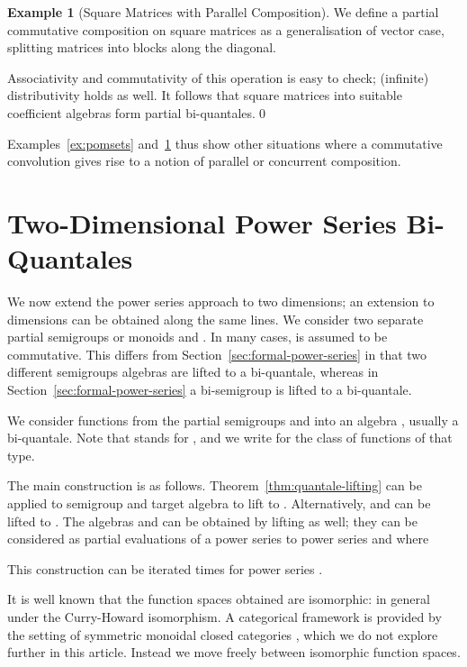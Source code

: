 \documentclass[12pt]{article}
\theoremstyle{definition}
\newtheorem{example}{Example}
\newcommand{\refsec}[1]{Section~\ref{#1}}
\begin{document}
 \begin{example}[Square Matrices with Parallel Composition]\label{ex:matrix-par}
   We define a partial commutative composition  on square
   matrices as a generalisation of vector case, splitting matrices
   into blocks along the diagonal.
   
   Associativity and commutativity of this operation is easy to check;
   (infinite) distributivity holds as well. It follows that square
   matrices into suitable coefficient algebras form partial
   bi-quantales.\qed
 \end{example}
 Examples~\ref{ex:pomsets} and~\ref{ex:matrix-par} thus show other
 situations where a commutative convolution gives rise to a notion of
 parallel or concurrent composition.




\section{Two-Dimensional Power Series
  Bi-Quantales}\label{sec:fpsbiquantale}

We now extend the power series approach to two dimensions; an
extension to  dimensions can be obtained along the same lines.  We
consider two separate partial semigroups or monoids  and
. In many cases,  is assumed to be
commutative. This differs from \refsec{sec:formal-power-series} in
that two different semigroups algebras are lifted to a bi-quantale,
whereas in \refsec{sec:formal-power-series} a bi-semigroup is lifted
to a bi-quantale.

We consider functions  from the partial semigroups
 and  into an algebra , usually a bi-quantale. Note that
 stands for , and we write  for
the class of functions of that type.

The main construction is as
follows. Theorem~\ref{thm:quantale-lifting} can be applied to
semigroup  and target algebra  to lift to
. Alternatively,  and  can be lifted to
. The algebras  and  can be
obtained by lifting as well; they can be considered as partial
evaluations of a power series  to power series
 and  where 

This construction can be iterated  times for power series
.

It is well known that the function spaces obtained are isomorphic: in
general 
under the Curry-Howard isomorphism.  A categorical framework is
provided by the setting of symmetric monoidal closed categories
\cite{Kelly}, which we do not explore further in this
article. Instead we move freely between isomorphic function spaces.
\end{document}
